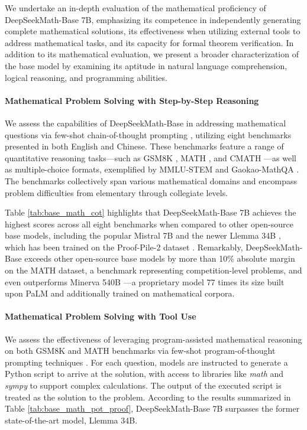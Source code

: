 \begin{itemize}[topsep=0pt]
We undertake an in-depth evaluation of the mathematical proficiency of DeepSeekMath-Base 7B, emphasizing its competence in independently generating complete mathematical solutions, its effectiveness when utilizing external tools to address mathematical tasks, and its capacity for formal theorem verification. In addition to its mathematical evaluation, we present a broader characterization of the base model by examining its aptitude in natural language comprehension, logical reasoning, and programming abilities.

\paragraph{Mathematical Problem Solving with Step-by-Step Reasoning}

We assess the capabilities of DeepSeekMath-Base in addressing mathematical questions via few-shot chain-of-thought prompting \citep{cot}, utilizing eight benchmarks presented in both English and Chinese. These benchmarks feature a range of quantitative reasoning tasks—such as GSM8K \citep{gsm8k}, MATH \citep{MATH}, and CMATH \citep{wei2023cmath}—as well as multiple-choice formats, exemplified by MMLU-STEM \citep{mmlu} and Gaokao-MathQA \citep{agieval}. The benchmarks collectively span various mathematical domains and encompass problem difficulties from elementary through collegiate levels.

Table \ref{tab:base_math_cot} highlights that DeepSeekMath-Base 7B achieves the highest scores across all eight benchmarks when compared to other open-source base models, including the popular Mistral 7B \citep{mistral} and the newer Llemma 34B \citep{llemma}, which has been trained on the Proof-Pile-2 dataset \citep{llemma}. Remarkably, DeepSeekMath-Base exceeds other open-source base models by more than 10\% absolute margin on the MATH dataset, a benchmark representing competition-level problems, and even outperforms Minerva 540B \citep{minerva}—a proprietary model 77 times its size built upon PaLM \citep{palm} and additionally trained on mathematical corpora.

\paragraph{Mathematical Problem Solving with Tool Use} We assess the effectiveness of leveraging program-assisted mathematical reasoning on both GSM8K and MATH benchmarks via few-shot program-of-thought prompting techniques \citep{pot,pal}. For each question, models are instructed to generate a Python script to arrive at the solution, with access to libraries like \textit{math} and \textit{sympy} to support complex calculations. The output of the executed script is treated as the solution to the problem. According to the results summarized in Table \ref{tab:base_math_pot_proof}, DeepSeekMath-Base 7B surpasses the former state-of-the-art model, Llemma 34B.


\end{itemize}
